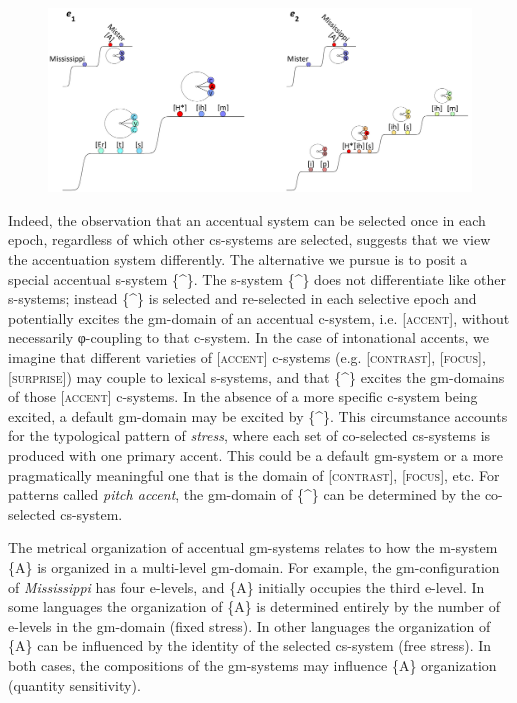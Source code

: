   
\begin{figure}
\includegraphics[width=\textwidth]{figures/Tilsen-img63.png}
\caption{\missingcaption}
\label{fig:}
\end{figure}
 

  Indeed, the observation that an accentual system can be selected once in each epoch, regardless of which other cs-systems are selected, suggests that we view the accentuation system differently. The alternative we pursue is to posit a special accentual s-system \{\^{}\}. The s-system \{\^{}\} does not differentiate like other s-systems; instead \{\^{}\} is selected and re-selected in each selective epoch and potentially excites the gm-domain of an accentual c-system, i.e. [\textsc{accent}], without necessarily φ-coupling to that c-system. In the case of intonational accents, we imagine that different varieties of [\textsc{accent}] c-systems (e.g. [\textsc{contrast}], [\textsc{focus}], [\textsc{surprise}]) may couple to lexical s-systems, and that \{\^{}\} excites the gm-domains of those [\textsc{accent}] c-systems. In the absence of a more specific c-system being excited, a default gm-domain may be excited by \{\^{}\}. This circumstance accounts for the typological pattern of \textit{stress}, where each set of co-selected cs-systems is produced with one primary accent. This could be a default gm-system or a more pragmatically meaningful one that is the domain of [\textsc{contrast}], [\textsc{focus}], etc. For patterns called \textit{pitch accent}, the gm-domain of \{\^{}\} can be determined by the co-selected cs-system.

  The metrical organization of accentual gm-systems relates to how the m-system \{A\} is organized in a multi-level gm-domain. For example, the gm-configuration of \textit{Mississippi} has four e-levels, and \{A\} initially occupies the third e-level. In some languages the organization of \{A\} is determined entirely by the number of e-levels in the gm-domain (fixed stress). In other languages the organization of \{A\} can be influenced by the identity of the selected cs-system (free stress). In both cases, the compositions of the gm-systems may influence \{A\} organization (quantity sensitivity). 

